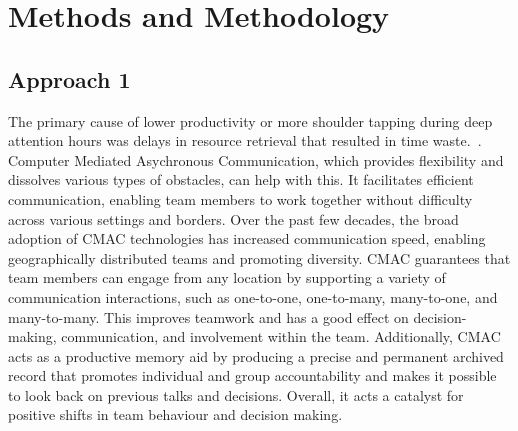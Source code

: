 \documentclass[runningheads]{llncs}
\begin{document}
\section{Methods and Methodology}
\subsection{Approach 1}
The primary cause of lower productivity or more shoulder tapping during deep attention hours was delays in resource retrieval that resulted in time waste.~\cite{refbook1}. Computer Mediated Asychronous Communication, which provides flexibility and dissolves various types of obstacles, can help with this. It facilitates efficient communication, enabling team members to work together without difficulty across various settings and borders. Over the past few decades, the broad adoption of CMAC technologies has increased communication speed, enabling geographically distributed teams and promoting diversity. CMAC guarantees that team members can engage from any location by supporting a variety of communication interactions, such as one-to-one, one-to-many, many-to-one, and many-to-many. This improves teamwork and has a good effect on decision-making, communication, and involvement within the team. Additionally, CMAC acts as a productive memory aid by producing a precise and permanent archived record that promotes individual and group accountability and makes it possible to look back on previous talks and decisions. Overall, it acts a catalyst for positive shifts in team behaviour and decision making.~\cite{refpaper5}
\end{document}

